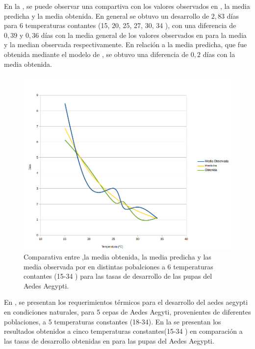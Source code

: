 En la , se puede observar una compartiva con los
valores observados en \cite{rueda1990temperature}, la media predicha y la media obtenida. En
general se obtuvo un desarrollo de $2,83$ días para 6 temperaturas contantes (15, 20, 25, 27,
30, 34 \textcelsius), con una diferencia de $0,39$ y $0,36$ días con la media general de los
valores observados en \cite{rueda1990temperature} para la media y la median observada respectivamente. En relación a la media predicha, que fue obtenida mediante el modelo de
\cite{sharpe1977reaction}, se obtuvo una diferencia de $0,2$ días con la media obtenida.

\begin{figure}[H]
    \centering
    \includegraphics[width=1\textwidth]{capitulo-6/graphics/desarrollo-pupa-rueda.png}
    \caption{\label{fig:desarrollo-pupa-rueda1990}
    Comparativa entre ,la media obtenida, la media predicha y las media observada por \cite{
    rueda1990temperature} en distintas pobalciones a 6 temperaturas contantes (15-34 \textcelsius)
    para las tasas de desarrollo de las pupas del Aedes Aegypti.}

\end{figure}


En \cite{BESERRA2006}, se presentan los requerimientos térmicos para el desarrollo del aedes
aegypti en condiciones naturales, para 5 cepas de Aedes Aegyti, provenientes de diferentes
poblaciones, a 5 temperaturas constantes (18-34\textcelsius). En la
 se presentan los resultados obtenidos a cinco
temperaturas constantes(15-34 \textcelsius) en comparación a las tasas de desarrollo obtenidas en
\cite{BESERRA2006} para las pupas del Aedes Aegypti.

